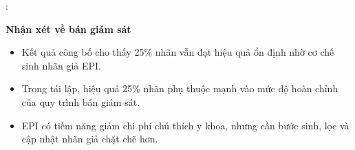 \begin{frame}{\secname: \subsecname}

\textbf{Nhận xét về bán giám sát}

\begin{itemize}
    \item Kết quả công bố cho thấy 25\% nhãn vẫn đạt hiệu quả ổn định nhờ cơ chế sinh nhãn giả EPI.
    \item Trong tái lập, hiệu quả 25\% nhãn phụ thuộc mạnh vào mức độ hoàn chỉnh của quy trình bán giám sát.
    \item EPI có tiềm năng giảm chi phí chú thích y khoa, nhưng cần bước sinh, lọc và cập nhật nhãn giả chặt chẽ hơn.
\end{itemize}

\end{frame}